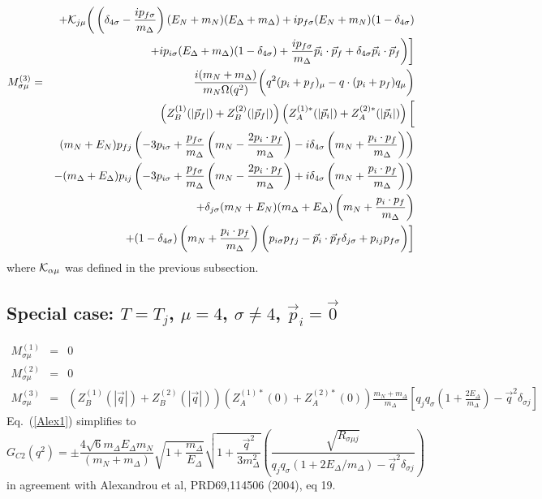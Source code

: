 \documentclass[12pt]{article}
\begin{document}
\begin{eqnarray}
&& +{\cal K}_{j\mu}\bigg(\left(\delta_{4\sigma}-\frac{ip_{f\sigma}}{m_\Delta}
   \right)(E_N+m_N)(E_\Delta+m_\Delta)+ip_{f\sigma}(E_N+m_N)
   (1-\delta_{4\sigma}) \nonumber \\
&& +ip_{i\sigma}(E_\Delta+m_\Delta)(1-\delta_{4\sigma})
   +\frac{ip_{f\sigma}}{m_\Delta}\vec p_i\cdot\vec p_f+\delta_{4\sigma}\vec
   p_i\cdot\vec p_f \bigg)\bigg] \\
M_{\sigma\mu}^{(3)}
 &=& \frac{i(m_N+m_\Delta)}{m_N\Omega(q^2)}\bigg(q^2(p_i+p_f)_\mu
     -q\cdot(p_i+p_f)q_\mu\bigg) \nonumber \\
  && \left(Z_B^{(1)}(|\vec{p}_f|)+Z_B^{(2)}(|\vec{p}_f|)\right)
     \left(Z_A^{(1)*}(|\vec{p}_i|)+Z_A^{(2)*}(|\vec{p}_i|)\right)\bigg[
     \nonumber \\
  && (m_N+E_N)p_{fj}\left(-3p_{i\sigma}+\frac{p_{f\sigma}}{m_\Delta}\left(m_N
     -\frac{2p_i\cdot p_f}{m_\Delta}\right)-i\delta_{4\sigma}\left(m_N
     +\frac{p_i\cdot p_f}{m_\Delta}\right)\right) \nonumber \\
  && -(m_\Delta+E_\Delta)p_{ij}\left(-3p_{i\sigma}+\frac{p_{f\sigma}}
     {m_\Delta}\left(m_N
     -\frac{2p_i\cdot p_f}{m_\Delta}\right)+i\delta_{4\sigma}\left(m_N
     +\frac{p_i\cdot p_f}{m_\Delta}\right)\right) \nonumber \\
  && +\delta_{j\sigma}(m_N+E_N)(m_\Delta+E_\Delta)\left(m_N+\frac{p_i\cdot p_f}
     {m_\Delta}\right) \nonumber \\
  && +(1-\delta_{4\sigma})\left(m_N+\frac{p_i\cdot p_f}{m_\Delta}\right)
     \bigg(p_{i\sigma}p_{fj}
     -\vec p_i\cdot\vec p_f\delta_{j\sigma}+p_{ij}p_{f\sigma}\bigg)\bigg]
\end{eqnarray}
where ${\cal K}_{\alpha\mu}$ was defined in the previous subsection.

\subsection{Special case: $T=T_j$, $\mu=4$, $\sigma\neq4$, $\vec p_i=\vec 0$}

\begin{eqnarray}
M_{\sigma\mu}^{(1)} &=& 0 \nonumber \\
M_{\sigma\mu}^{(2)} &=& 0 \nonumber \\
M_{\sigma\mu}^{(3)}
 &=& \left(Z_B^{(1)}(|\vec q|)+Z_B^{(2)}(|\vec q|)\right)
     \left(Z_A^{(1)*}(0)+Z_A^{(2)*}(0)\right)
     \frac{m_N+m_\Delta}{m_\Delta}
     \left[q_jq_\sigma\left(1+\frac{2E_\Delta}{m_\Delta}\right)
     -\vec q^2\delta_{\sigma j}\right] \nonumber
\end{eqnarray}
Eq.~(\ref{Alex1}) simplifies to
\[
G_{C2}(q^2) = \pm\frac{4\sqrt{6}m_\Delta E_\Delta m_N}{(m_N+m_\Delta)}
              \sqrt{1+\frac{m_\Delta}{E_\Delta}}
              \sqrt{1+\frac{\vec q^2}{3m_\Delta^2}}
              \left(\frac{\sqrt{R_{\sigma\mu j}}}
              {q_jq_\sigma(1+2E_\Delta/m_\Delta)
              -\vec q^2\delta_{\sigma j}}\right)
\]
in agreement with Alexandrou et al, PRD69,114506 (2004), eq 19.
\end{document}
